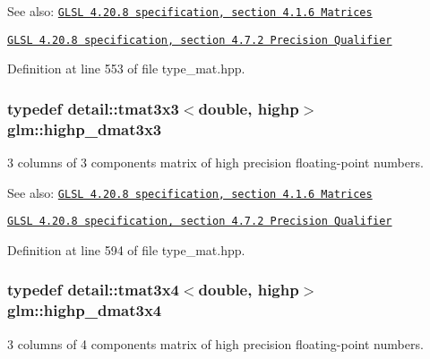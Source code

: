 \begin{Desc}
\item[See also:]\href{http://www.opengl.org/registry/doc/GLSLangSpec.4.20.8.pdf}{\tt GLSL 4.20.8 specification, section 4.1.6 Matrices} 

\href{http://www.opengl.org/registry/doc/GLSLangSpec.4.20.8.pdf}{\tt GLSL 4.20.8 specification, section 4.7.2 Precision Qualifier} \end{Desc}


Definition at line 553 of file type\_\-mat.hpp.\hypertarget{group__core__precision_gd7229dea82287910d88e6e8566e39fc7}{
\subsubsection[highp\_\-dmat3x3]{\setlength{\rightskip}{0pt plus 5cm}typedef detail::tmat3x3$<$double, highp$>$ {\bf glm::highp\_\-dmat3x3}}}
\label{group__core__precision_gd7229dea82287910d88e6e8566e39fc7}


3 columns of 3 components matrix of high precision floating-point numbers.

\begin{Desc}
\item[See also:]\href{http://www.opengl.org/registry/doc/GLSLangSpec.4.20.8.pdf}{\tt GLSL 4.20.8 specification, section 4.1.6 Matrices} 

\href{http://www.opengl.org/registry/doc/GLSLangSpec.4.20.8.pdf}{\tt GLSL 4.20.8 specification, section 4.7.2 Precision Qualifier} \end{Desc}


Definition at line 594 of file type\_\-mat.hpp.\hypertarget{group__core__precision_gff199c8d04a8edb92ed43283e8694c59}{
\subsubsection[highp\_\-dmat3x4]{\setlength{\rightskip}{0pt plus 5cm}typedef detail::tmat3x4$<$double, highp$>$ {\bf glm::highp\_\-dmat3x4}}}
\label{group__core__precision_gff199c8d04a8edb92ed43283e8694c59}


3 columns of 4 components matrix of high precision floating-point numbers.

